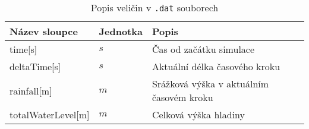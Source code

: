 
\begin{table}[t]
 

 \centering
 \caption{Popis veličin  v {\tt.dat} souborech}
\label{tab:vystupydat}

 \begin{tabular}{llp{}}
  \hline  \hline
 Název sloupce    & Jednotka    & Popis       \\ 
  \hline
 time[s]          &   $s$      &  Čas od začátku simulace          \\
 deltaTime[s]     &   $s$        &  Aktuální délka časového kroku  \\
 rainfall[m]      &  $m$         &  Srážková výška v aktuálním časovém kroku \\
 totalWaterLevel[m]	  &   $m$	&  Celková výška hladiny  \\ 

\end{tabular}
\end{table}
